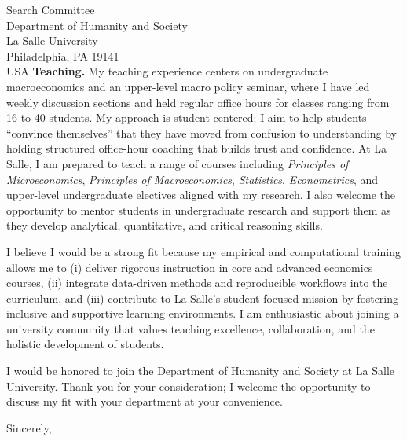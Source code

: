\documentclass[11pt,letterpaper]{letter}
\begin{document}
\begin{letter}{Search Committee \\
Department of Humanity and Society \\
La Salle University \\
Philadelphia, PA 19141 \\ USA}
\textbf{Teaching.} My teaching experience centers on undergraduate macroeconomics and an upper-level macro policy seminar, where I have led weekly discussion sections and held regular office hours for classes ranging from 16 to 40 students. My approach is student-centered: I aim to help students “convince themselves” that they have moved from confusion to understanding by holding structured office-hour coaching that builds trust and confidence. At La Salle, I am prepared to teach a range of courses including \textit{Principles of Microeconomics}, \textit{Principles of Macroeconomics}, \textit{Statistics}, \textit{Econometrics}, and upper-level undergraduate electives aligned with my research. I also welcome the opportunity to mentor students in undergraduate research and support them as they develop analytical, quantitative, and critical reasoning skills.

I believe I would be a strong fit because my empirical and computational training allows me to (i) deliver rigorous instruction in core and advanced economics courses, (ii) integrate data-driven methods and reproducible workflows into the curriculum, and (iii) contribute to La Salle’s student-focused mission by fostering inclusive and supportive learning environments. I am enthusiastic about joining a university community that values teaching excellence, collaboration, and the holistic development of students.

I would be honored to join the Department of Humanity and Society at La Salle University. Thank you for your consideration; I welcome the opportunity to discuss my fit with your department at your convenience.

\closing{Sincerely,}

\end{letter}
\end{document}
